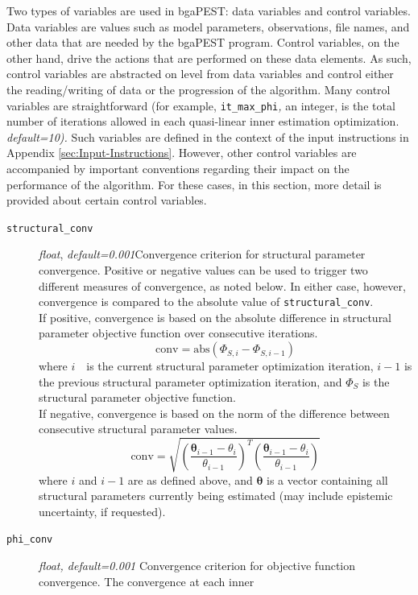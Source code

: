 \documentclass[11pt,oneside,onecolumn]{usgsreport}
\begin{document}
\begin{multicols}{2}
Two types of variables are used in bgaPEST: data variables and control
variables. Data variables are values such as model parameters, observations,
file names, and other data that are needed by the bgaPEST program.
Control variables, on the other hand, drive the actions that are performed
on these data elements. As such, control variables are abstracted
on level from data variables and control either the reading/writing
of data or the progression of the algorithm. Many control variables
are straightforward (for example, \texttt{it\_max\_phi}\emph{, }an
integer, is the total number of iterations allowed in each quasi-linear
inner estimation optimization. \emph{default=10).} Such variables
are defined in the context of the input instructions in Appendix \ref{sec:Input-Instructions}.
However, other control variables are accompanied by important conventions
regarding their impact on the performance of the algorithm. For these
cases, in this section, more detail is provided about certain control
variables.
\begin{description}
\item [{\texttt{structural\_conv}}] \emph{float}, \emph{default=0.001}Convergence
criterion for structural parameter convergence. Positive or negative
values can be used to trigger two different measures of convergence,
as noted below. In either case, however, convergence is compared to
the absolute value of \texttt{structural\_conv}. \\
If positive, convergence is based on the absolute difference in structural
parameter objective function over consecutive iterations. 
\[
\mathrm{conv}=\mathrm{abs}\left(\Phi_{S,i}-\Phi_{S,i-1}\right)
\]
where $i\mbox{ }$ is the current structural parameter optimization
iteration, $i-1$ is the previous structural parameter optimization
iteration, and $\Phi_{S}$ is the structural parameter objective
function.\\
If negative, convergence is based on the norm of the difference between
consecutive structural parameter values.
\[
\mathrm{conv=}\sqrt{\left(\frac{\mathbf{\theta}_{i-1}-\theta_{i}}{\theta_{i-1}}\right)^{T}\left(\frac{\mathbf{\theta}_{i-1}-\theta_{i}}{\theta_{i-1}}\right)}
\]
where $i$ and $i-1$ are as defined above, and $\mathbf{\theta}$
is a vector containing all structural parameters currently being estimated
(may include epistemic uncertainty, if requested). 
\item [{\texttt{phi\_conv}}] \emph{float, default=0.001 }Convergence criterion
for objective function convergence. The convergence at each inner

\end{description}
\end{multicols}
\end{document}
